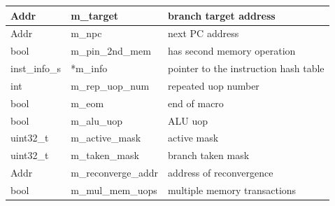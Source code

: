 \begin{table}[htb]
\begin{footnotesize}
\begin{center}
\begin{tabular}{|l|l|l|}
Addr      &   m\_target              & branch target address \\ \hline
Addr      &   m\_npc                 & next PC address  \\ \hline
bool      &   m\_pin\_2nd\_mem       & has second memory operation \\ \hline
inst\_info\_s& *m\_info              & pointer to the instruction hash table  \\ \hline
int       &   m\_rep\_uop\_num       & repeated uop number \\ \hline
bool      &   m\_eom                 & end of macro \\ \hline
bool      &   m\_alu\_uop            & ALU uop  \\ \hline
uint32\_t  &   m\_active\_mask       & active mask \\ \hline
uint32\_t  &   m\_taken\_mask        & branch taken mask \\ \hline
Addr      &   m\_reconverge\_addr    & address of reconvergence \\ \hline
bool      &   m\_mul\_mem\_uops      & multiple memory transactions \\ \hline

\end{tabular}
\end{center}
\end{footnotesize}
\end{table}

